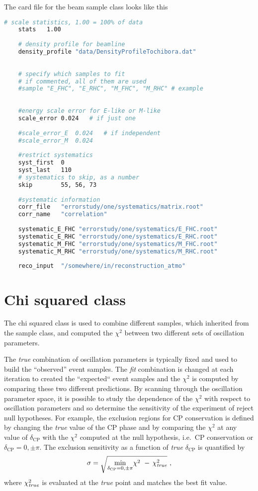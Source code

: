 \documentclass[a4paper, 11pt]{article}
\begin{document}
The card file for the beam sample class looks like this
\begin{lstlisting}[language=bash]
    # scale statistics, 1.00 = 100% of data
    stats	1.00
    
    # density profile for beamline
    density_profile	"data/DensityProfileTochibora.dat"
    
    
    # specify which samples to fit
    # if commented, all of them are used
    #sample	"E_FHC", "E_RHC", "M_FHC", "M_RHC" # example
    
    
    #energy scale error for E-like or M-like
    scale_error	0.024	# if just one
    
    #scale_error_E	0.024	# if independent
    #scale_error_M	0.024
    
    #restrict systematics
    syst_first	0
    syst_last	110
    # systematics to skip, as a number
    skip		55, 56, 73
    
    #systematic information
    corr_file	"errorstudy/one/systematics/matrix.root"
    corr_name	"correlation"
    
    systematic_E_FHC "errorstudy/one/systematics/E_FHC.root"
    systematic_E_RHC "errorstudy/one/systematics/E_RHC.root"
    systematic_M_FHC "errorstudy/one/systematics/M_FHC.root"
    systematic_M_RHC "errorstudy/one/systematics/M_RHC.root"
    
    reco_input	"/somewhere/in/reconstruction_atmo"
\end{lstlisting}


\section{Chi squared class}
\label{sec:x2}

The chi squared class is used to combine different samples, which inherited from the sample class, and %
computed the $\chi^2$ between two different sets of oscillation parameters.

The \emph{true} combination of oscillation parameters is typically fixed and used to build the %
``observed'' event samples.
The \emph{fit} combination is changed at each iteration to created the ``expected`` event samples %
and the $\chi^2$ is computed by comparing these two different predictions.
By scanning through the oscillation parameter space, it is possible to study the dependence of the $\chi^2$ %
with respect to oscillation parameters and so determine the sensitivity of the experiment of reject null hypotheses.
For example, the exclusion regions for CP conservation is defined by changing the \emph{true} value of the CP phase %
and by comparing the $\chi^2$ at any value of $\delta_\text{CP}$ with the $\chi^2$ computed at %
the null hypothesis, i.e.\ CP conservation or $\delta_\text{CP} = 0, \pm\pi$.
The exclusion sensitivity as a function of \emph{true} $\delta_\text{CP}$ %
is quantified by %
\begin{equation}
	\sigma = \sqrt{\min_{\delta_\text{CP} = 0,\pm\pi}\! \chi^2\  -\,\chi^2_\text{\emph{true}}}\ ,
\end{equation}
where $\chi^2_\text{\emph{true}}$ is evaluated at the \emph{true} point and matches the best fit value.
\end{document}
